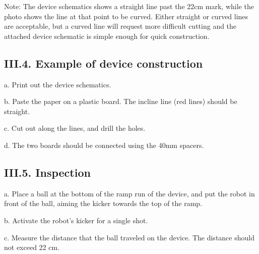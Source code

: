 \documentclass{article}
\begin{document}
Note: The device schematics shows a straight line past the 22cm mark, while the photo shows the line at that point to be curved. Either straight or curved lines are acceptable, but a curved line will request more difficult cutting and the attached device schematic is simple enough for quick construction.

\subsection{III.4. Example of device construction}

a. Print out the device schematics.

b. Paste the paper on a plastic board. The incline line (red lines) should be straight.

c. Cut out along the lines, and drill the holes.

d. The two boards should be connected using the 40mm spacers.

\subsection{III.5. Inspection}

a. Place a ball at the bottom of the ramp run of the device, and put the robot in front of the ball, aiming the kicker towards the top of the ramp.

b. Activate the robot's kicker for a single shot.

c. Measure the distance that the ball traveled on the device. The distance should not exceed 22 cm.
\end{document}
